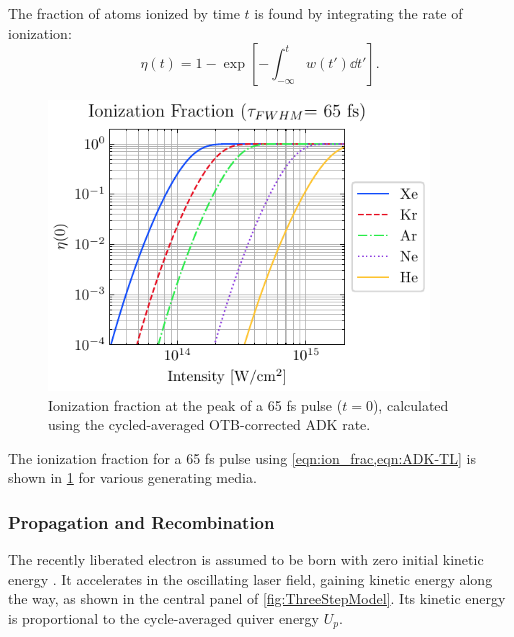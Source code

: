 The fraction of atoms ionized by time $t$ is found by integrating the rate of ionization:
\begin{equation}
\eta(t) = 1 - \exp \left[ - \int_{-\infty}^{t} w(t') \dd{t'} \right].
\label{eqn:ion_frac}
\end{equation}

\begin{figure}
	\centering
	\includegraphics[width=0.9\textwidth]{figures/chap1/ADK_ion_frac_TL.pdf}
	\caption{Ionization fraction at the peak of a 65 fs pulse ($t=0$), calculated using the cycled-averaged OTB-corrected ADK rate.}
	\label{fig:ADK_ion_frac}
\end{figure}

The ionization fraction for a 65 fs pulse using \cref{eqn:ion_frac,eqn:ADK-TL} is shown in \cref{fig:ADK_ion_frac} for various generating media.

\subsubsection{Propagation and Recombination}
\label{sec:HHG_propagation_recombination}

The recently liberated electron is assumed to be born with zero initial kinetic energy \cite{changFundamentalsAttosecondOptics2011}. It accelerates in the oscillating laser field, gaining kinetic energy along the way, as shown in the central panel of \cref{fig:ThreeStepModel}. Its kinetic energy is proportional to the cycle-averaged quiver energy $U_p$.

